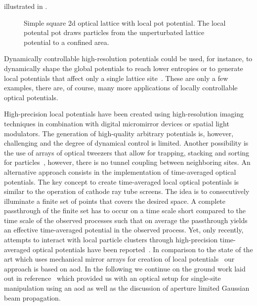 illustrated in .
\begin{figure}[htb]
  \centering
  \begin{adjustbox}{width=\textwidth}
    
  \end{adjustbox}
  \caption{Simple square \gls{2d} optical lattice with local pot potential.
    The local potental pot draws particles from the unperturbated lattice
    potential to a confined area.
  }\label{fig:optical_lattice_local_pot}
\end{figure}
Dynamically controllable high-resolution potentials could be used, for
instance, to dynamically shape the global potentials to reach lower entropies
or to generate local potentials that affect only a single lattice
site~\cite{Ho2009,Bernier2009,Mazurenko2017}. These are only a few examples,
there are, of course, many more applications of locally controllable optical
potentials.

High-precision local potentials have been created using high-resolution
imaging techniques in combination with digital micromirror devices or spatial
light modulators. The generation of high-quality arbitrary potentials is,
however, challenging and the degree of dynamical control is limited. Another
possibility is the use of arrays of optical tweezers that allow for trapping,
stacking and sorting for particles~\cite{Roxworthy2012}, however, there is no
tunnel coupling between neighboring sites. An alternative approach consists in
the implementation of time-averaged optical potentials. The key concept to
create time-averaged local optical potentials is similar to the operation of
cathode ray tube screens. The idea is to consecutively illuminate a finite
set of points that covers the desired space. A complete passthrough of the
finite set has to occur on a time scale short compared to the time scale
of the observed processes such that on average the passthrough yields an
effective time-averaged potential in the observed process. Yet, only recently,
attempts to interact with local particle clusters through high-precision
time-averaged optical potentials have been reported~\cite{Roy2016}.
In comparison to the state of the art which uses mechanical mirror arrays for
creation of local potentials~\cite{Roy2016} our approach is based on
\gls{aod}. In the following we continue on the ground work laid out in
reference~\cite{Hertlein2017} which provided us with an optical setup for
single-site manipulation using an \gls{aod} as well as the discussion of
aperture limited Gaussian beam propagation.

